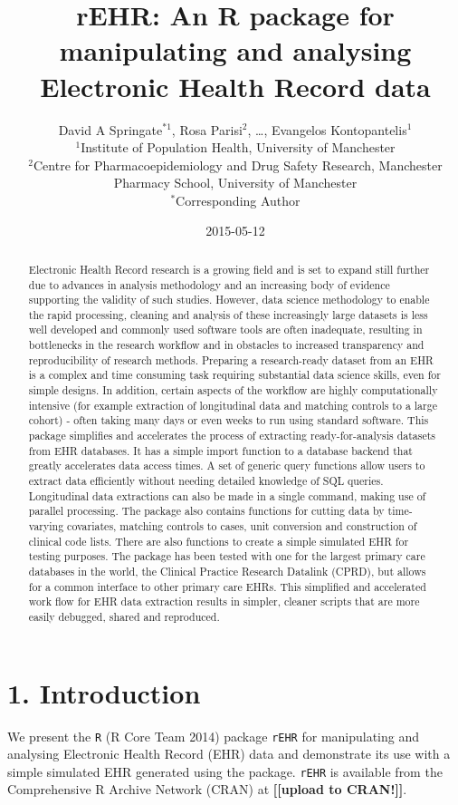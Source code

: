 \documentclass[]{article}
\title{rEHR: An R package for manipulating and analysing Electronic Health
Record data}
\author{David A Springate\(^{*1}\), Rosa Parisi\(^{2}\), \ldots{}, Evangelos
Kontopantelis\(^{1}\) \\ \(^{1}\)Institute of Population Health, University of Manchester \\ \(^{2}\)Centre for Pharmacoepidemiology and Drug Safety Research,
Manchester Pharmacy School, University of Manchester \\ \(^{*}\)Corresponding Author}
\date{2015-05-12}
\begin{document}
\maketitle

\begin{abstract}
Electronic Health Record research is a growing field and is set to
expand still further due to advances in analysis methodology and an
increasing body of evidence supporting the validity of such studies.
However, data science methodology to enable the rapid processing,
cleaning and analysis of these increasingly large datasets is less well
developed and commonly used software tools are often inadequate,
resulting in bottlenecks in the research workflow and in obstacles to
increased transparency and reproducibility of research methods.
Preparing a research-ready dataset from an EHR is a complex and time
consuming task requiring substantial data science skills, even for
simple designs. In addition, certain aspects of the workflow are highly
computationally intensive (for example extraction of longitudinal data
and matching controls to a large cohort) - often taking many days or
even weeks to run using standard software. This package simplifies and
accelerates the process of extracting ready-for-analysis datasets from
EHR databases. It has a simple import function to a database backend
that greatly accelerates data access times. A set of generic query
functions allow users to extract data efficiently without needing
detailed knowledge of SQL queries. Longitudinal data extractions can
also be made in a single command, making use of parallel processing. The
package also contains functions for cutting data by time-varying
covariates, matching controls to cases, unit conversion and construction
of clinical code lists. There are also functions to create a simple
simulated EHR for testing purposes. The package has been tested with one
for the largest primary care databases in the world, the Clinical
Practice Research Datalink (CPRD), but allows for a common interface to
other primary care EHRs. This simplified and accelerated work flow for
EHR data extraction results in simpler, cleaner scripts that are more
easily debugged, shared and reproduced.
\end{abstract}

\section{1. Introduction}\label{introduction}

We present the \texttt{R} (R Core Team 2014) package \texttt{rEHR} for
manipulating and analysing Electronic Health Record (EHR) data and
demonstrate its use with a simple simulated EHR generated using the
package. \texttt{rEHR} is available from the Comprehensive R Archive
Network (CRAN) at \textbf{{[}{[}upload to CRAN!{]}{]}}.
\end{document}
